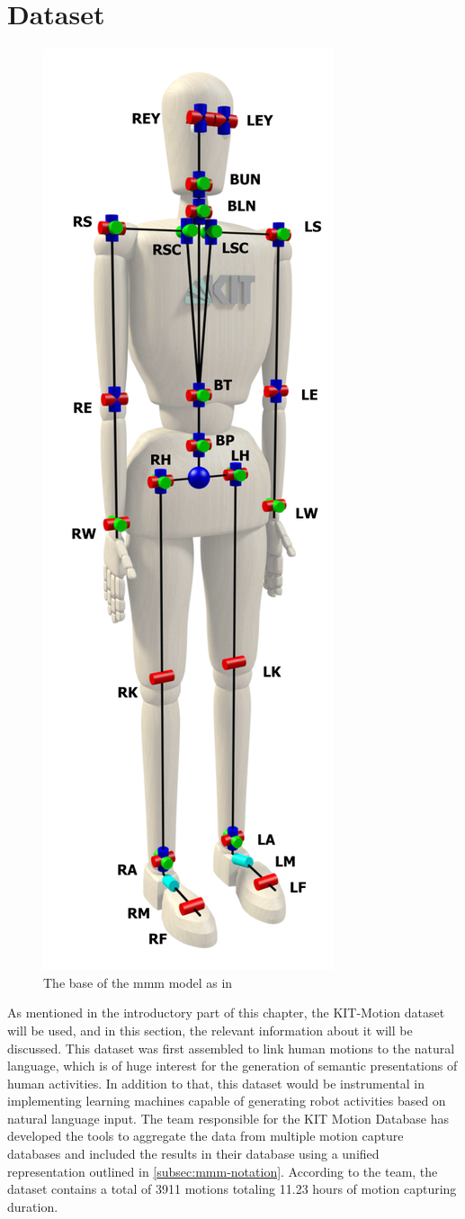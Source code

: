 	\section{Dataset}
		\begin{figure}
			\vspace{-5.5cm}
			\begin{center}
				\includegraphics[width=.32\textwidth]{img/mmm-model.png}
				\caption{The base of the mmm model as in \cite{Plappert2016}}
				\label{fig:mmm-model}
			\end{center}
		\end{figure}
		As mentioned in the introductory part of this chapter, the KIT-Motion dataset\cite{Plappert2016} will be used, and in this section, the relevant information about it will be discussed. This dataset was first assembled to link human motions to the natural language, which is of huge interest for the generation of semantic presentations of human activities. In addition to that, this dataset would be instrumental in implementing learning machines capable of generating robot activities based on natural language input\cite{Plappert2016}. The team responsible for the KIT Motion Database has developed the tools to aggregate the data from multiple motion capture databases and included the results in their database using a unified representation outlined in \ref{subsec:mmm-notation}. According to the team, the dataset contains a total of 3911 motions totaling 11.23 hours of motion capturing duration\cite{Plappert2016}.
